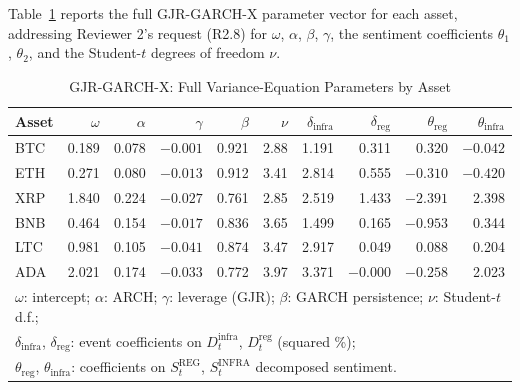 \documentclass[pdflatex,sn-mathphys-num]{sn-jnl}
\theoremstyle{thmstyleone}
\theoremstyle{thmstyletwo}
\theoremstyle{thmstylethree}
\begin{document}
Table~\ref{tab:full_parameters} reports the full GJR-GARCH-X parameter vector for each asset, addressing Reviewer 2's request (R2.8) for $\omega$, $\alpha$, $\beta$, $\gamma$, the sentiment coefficients $\theta_1$, $\theta_2$, and the Student-$t$ degrees of freedom $\nu$.

\begin{table}[htbp]
\centering
\caption{GJR-GARCH-X: Full Variance-Equation Parameters by Asset}\label{tab:full_parameters}
\footnotesize
\begin{tabular}{@{}lrrrrrrrrr@{}}
\toprule
\textbf{Asset} & \boldmath$\omega$ & \boldmath$\alpha$ & \boldmath$\gamma$ & \boldmath$\beta$ & \boldmath$\nu$ & \boldmath$\delta_{\text{infra}}$ & \boldmath$\delta_{\text{reg}}$ & \boldmath$\theta_{\text{reg}}$ & \boldmath$\theta_{\text{infra}}$ \\
\midrule
BTC & 0.189 & 0.078 & $-0.001$ & 0.921 & 2.88 & 1.191 & 0.311 & 0.320 & $-0.042$ \\
ETH & 0.271 & 0.080 & $-0.013$ & 0.912 & 3.41 & 2.814 & 0.555 & $-0.310$ & $-0.420$ \\
XRP & 1.840 & 0.224 & $-0.027$ & 0.761 & 2.85 & 2.519 & 1.433 & $-2.391$ & 2.398 \\
BNB & 0.464 & 0.154 & $-0.017$ & 0.836 & 3.65 & 1.499 & 0.165 & $-0.953$ & 0.344 \\
LTC & 0.981 & 0.105 & $-0.041$ & 0.874 & 3.47 & 2.917 & 0.049 & 0.088 & 0.204 \\
ADA & 2.021 & 0.174 & $-0.033$ & 0.772 & 3.97 & 3.371 & $-0.000$ & $-0.258$ & 2.023 \\
\bottomrule
\multicolumn{10}{l}{\footnotesize $\omega$: intercept; $\alpha$: ARCH; $\gamma$: leverage (GJR); $\beta$: GARCH persistence; $\nu$: Student-$t$ d.f.;} \\
\multicolumn{10}{l}{\footnotesize $\delta_{\text{infra}}$, $\delta_{\text{reg}}$: event coefficients on $D^{\text{infra}}_t$, $D^{\text{reg}}_t$ (squared \%);} \\
\multicolumn{10}{l}{\footnotesize $\theta_{\text{reg}}$, $\theta_{\text{infra}}$: coefficients on $S^{\text{REG}}_t$, $S^{\text{INFRA}}_t$ decomposed sentiment.} \\
\end{tabular}
\end{table}
\end{document}
